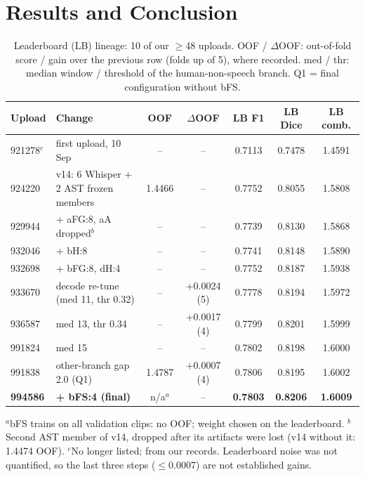 \documentclass[conference]{IEEEtran}
\begin{document}
\section{Results and Conclusion}\label{sec:res}
\begin{table}[t]
\caption{Leaderboard (LB) lineage: 10 of our $\ge$48 uploads. OOF / $\Delta$OOF: out-of-fold score / gain over
the previous row (folds up of 5), where recorded. med / thr: median window / threshold of the human-non-speech
branch. Q1 = final configuration without bFS.}
\label{tab:res}
\centering
\scriptsize
\setlength{\tabcolsep}{2pt}
\begin{tabular}{@{}l>{\raggedright\arraybackslash}p{2.75cm}ccccc@{}}
\toprule
Upload & Change & OOF & $\Delta$OOF & LB F1 & LB Dice & LB comb. \\
\midrule
921278$^{c}$ & first upload, 10 Sep & -- & -- & 0.7113 & 0.7478 & 1.4591 \\
924220 & v14: 6 Whisper + 2 AST frozen members & 1.4466 & -- & 0.7752 & 0.8055 & 1.5808 \\
929944 & + aFG:8, aA dropped$^{b}$ & -- & -- & 0.7739 & 0.8130 & 1.5868 \\
932046 & + bH:8 & -- & -- & 0.7741 & 0.8148 & 1.5890 \\
932698 & + bFG:8, dH:4 & -- & -- & 0.7752 & 0.8187 & 1.5938 \\
933670 & decode re-tune (med 11, thr 0.32) & -- & +0.0024 (5) & 0.7778 & 0.8194 & 1.5972 \\
936587 & med 13, thr 0.34 & -- & +0.0017 (4) & 0.7799 & 0.8201 & 1.5999 \\
991824 & med 15 & -- & -- & 0.7802 & 0.8198 & 1.6000 \\
991838 & other-branch gap 2.0 (Q1) & 1.4787 & +0.0007 (4) & 0.7806 & 0.8195 & 1.6002 \\
\textbf{994586} & \textbf{+ bFS:4 (final)} & n/a$^{a}$ & -- & \textbf{0.7803} & \textbf{0.8206} & \textbf{1.6009} \\
\bottomrule
\end{tabular}

\smallskip
\raggedright
$^{a}$bFS trains on all validation clips: no OOF; weight chosen on the leaderboard. $^{b}$Second AST member of v14,
dropped after its artifacts were lost (v14 without it: 1.4474 OOF). $^{c}$No longer listed; from our records.
Leaderboard noise was not quantified, so the last three steps ($\le$0.0007) are not established gains.
\end{table}
\end{document}

